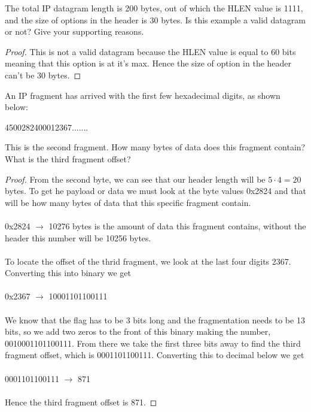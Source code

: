 \documentclass[12pt]{article}
\newenvironment{exercise}[2][Exercise]{\begin{trivlist}
\item[\hskip \labelsep {\bfseries #1}\hskip \labelsep {\bfseries #2.}]}{\end{trivlist}}
\begin{document}
\begin{exercise}{7}
The total IP datagram length is 200 bytes, out of which the HLEN value is 1111, and the
size of options in the header is 30 bytes. Is this example a valid datagram or not? Give your
supporting reasons.
\end{exercise}

\begin{proof}
This is not a valid datagram because the HLEN value is equal to 60 bits meaning that this option is at it's max. Hence the size of option in the header can't be 30 bytes. 
\end{proof}

\begin{exercise}{8}
An IP fragment has arrived with the first few hexadecimal digits, as shown below: 
\begin{center}
4500282400012367.......
\end{center}
This is the second fragment. How many bytes of data does this fragment contain? What is the third fragment offset?
\end{exercise}

\begin{proof}
From the second byte, we can see that our header length will be $5 \cdot 4 = 20$ bytes. To get he payload or data we must look at the byte values 0x2824 and that will be how many bytes of data that this specific fragment contain. \\ \\
0x2824 $\longrightarrow$ 10276 bytes is the amount of data this fragment contains, without the header this number will be 10256 bytes. \\ \\ 
To locate the offset of the thrid fragment, we look at the last four digits 2367. Converting this into binary we get \\ \\
0x2367 $\longrightarrow$ 10001101100111 \\ \\
We know that the flag has to be 3 bits long and the fragmentation needs to be 13 bits, so we add two zeros to the front of this binary making the number, 0010001101100111. From there we take the first three bits away to find the third fragment offset, which is 0001101100111. Converting this to decimal below we get \\ \\ 
0001101100111 $\longrightarrow$ 871 \\ \\ 
Hence the third fragment offset is 871. 
\end{proof}
\end{document}
